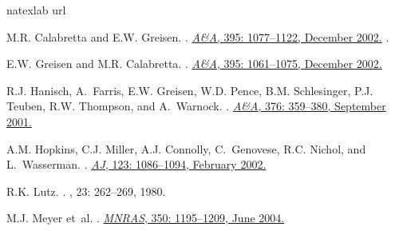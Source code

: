 \begin{thebibliography}{9}
\expandafter\ifx\csname natexlab\endcsname\relax\def\natexlab#1{#1}\fi
\expandafter\ifx\csname url\endcsname\relax
  \def\url#1{{\tt #1}}\fi

M.R. {Calabretta} and E.W. {Greisen}.
.
\newblock
\href{http://adsabs.harvard.edu/cgi-bin/nph-bib_query?bibcode=2002A%26A...395%.1077C&db_key=AST}%
{{\em A\&A}, 395: 1077--1122, December 2002.}
.

E.W. {Greisen} and M.R. {Calabretta}.
.
\newblock
\href{http://adsabs.harvard.edu/cgi-bin/nph-bib_query?bibcode=2002A%26A...395%.1061G&db_key=AST}%
{{\em A\&A}, 395: 1061--1075, December 2002.}

R.J. {Hanisch}, A.~{Farris}, E.W. {Greisen}, W.D. {Pence}, B.M. {Schlesinger},
  P.J. {Teuben}, R.W. {Thompson}, and A.~{Warnock}.
.
\newblock 
\href{http://adsabs.harvard.edu/cgi-bin/nph-bib_query?bibcode=2001A%
..359H&db_key=AST}%
{{\em A\&A}, 376: 359--380, September 2001.}

A.M. {Hopkins}, C.J. {Miller}, A.J. {Connolly}, C.~{Genovese}, R.C. {Nichol},
  and L.~{Wasserman}.
.
\newblock 
\href{http://adsabs.harvard.edu/cgi-bin/nph-bib_query?bibcode=2002AJ....123.1%
086H&db_key=AST}%
{{\em AJ}, 123: 1086--1094, February 2002.}

R.K. Lutz.
.
, 23: 262--269, 1980.

M.J. {Meyer} et~al.
.
\href{http://adsabs.harvard.edu/cgi-bin/nph-bib_query?bibcode=2004MNRAS.350.1%
195M&db_key=AST}%
{{\em MNRAS}, 350: 1195--1209, June 2004.}


\end{thebibliography}
